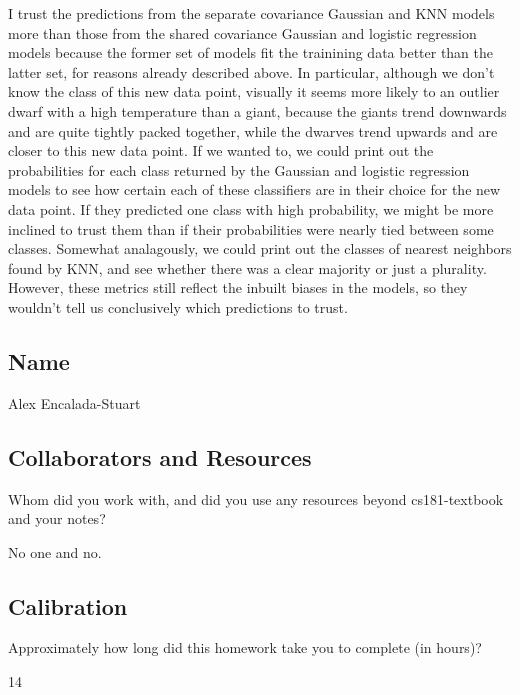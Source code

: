 \documentclass[submit]{harvardml}
\begin{document}
\begin{enumerate}
	I trust the predictions from the separate covariance Gaussian and KNN models more than those from the shared covariance Gaussian and logistic regression models because the former set of models fit the trainining data better than the latter set, for reasons already described above. In particular, although we don't know the class of this new data point, visually it seems more likely to an outlier dwarf with a high temperature than a giant, because the giants trend downwards and are quite tightly packed together, while the dwarves trend upwards and are closer to this new data point. If we wanted to, we could print out the probabilities for each class returned by the Gaussian and logistic regression models to see how certain each of these classifiers are in their choice for the new data point. If they predicted one class with high probability, we might be more inclined to trust them than if their probabilities were nearly tied between some classes. Somewhat analagously, we could print out the classes of nearest neighbors found by KNN, and see whether there was a clear majority or just a plurality. However, these metrics still reflect the inbuilt biases in the models, so they wouldn't tell us conclusively which predictions to trust.
	
\end{enumerate}

\newpage
\subsection*{Name}

Alex Encalada-Stuart

\subsection*{Collaborators and Resources}
Whom did you work with, and did you use any resources beyond cs181-textbook and your notes?

No one and no.

\subsection*{Calibration}
Approximately how long did this homework take you to complete (in hours)?

14
\end{document}
